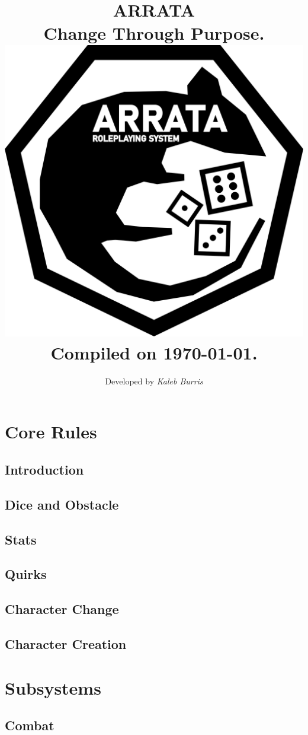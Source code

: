 \documentclass[oneside]{book}
\title{
    \textbf{ARRATA} 
    \\
    \large Change Through Purpose.
    \\
    \includegraphics[width=\textwidth]{rat.png}
    \\
    Compiled on \today.
}
\date{}
\author{Developed by {\em Kaleb Burris}}
\begin{document}
    \maketitle

    \let\cleardoublepage\clearpage
    \setlength{\headheight}{2cm}
    \addtolength{\topmargin}{-2cm}

    \tableofcontents

    \part{Core Rules}

    \chapter{Introduction}
    

    \chapter{Dice and Obstacle}
    

    \chapter{Stats}

    \chapter{Quirks}

    \chapter{Character Change}

    \chapter{Character Creation}

    \part{Subsystems}

    \chapter{Combat}
\end{document}
